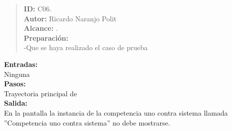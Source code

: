 

\begin{quote} %
	\textbf{ID:} C06.\\
    \textbf{Autor: } Ricardo Naranjo Polit\\
	\textbf{Alcance:}  .\\
    \textbf{Preparación:}\\
      -Que se haya realizado el caso de prueba \\

\end{quote}

    \textbf{Entradas:}\\
    Ninguna\\
    \textbf{Pasos:}\\

    Trayectoria principal de \\

    \textbf{Salida:}\\

     En la pantalla  la instancia de la competencia uno contra sistema llamada ''Competencia uno contra sistema'' no debe mostrarse.
